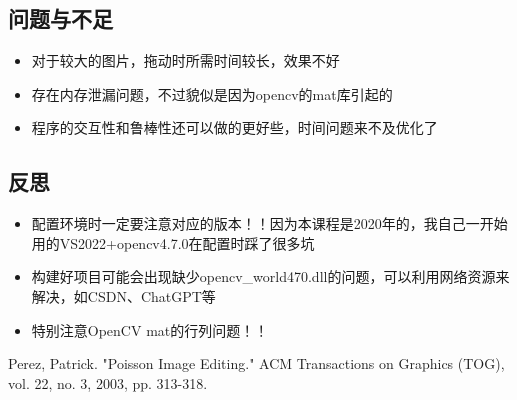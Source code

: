 \documentclass{article}
\begin{document}
    
     \subsection{问题与不足}
     
     \begin{itemize}
     	\item 对于较大的图片，拖动时所需时间较长，效果不好
     \end{itemize}
 
    \begin{itemize}
 	\item 存在内存泄漏问题，不过貌似是因为opencv的mat库引起的
    \end{itemize}

    \begin{itemize}
	\item 程序的交互性和鲁棒性还可以做的更好些，时间问题来不及优化了
    \end{itemize}


  \subsection{反思}
  
   \begin{itemize}
  	\item 配置环境时一定要注意对应的版本！！因为本课程是2020年的，我自己一开始用的VS2022+opencv4.7.0在配置时踩了很多坑
  \end{itemize}

 \begin{itemize}
	\item 构建好项目可能会出现缺少opencv\_world470.dll的问题，可以利用网络资源来解决，如CSDN、ChatGPT等
\end{itemize}

 \begin{itemize}
	\item 特别注意OpenCV mat的行列问题！！
\end{itemize}

	
	
	
	
	
	





\begin{thebibliography}{99}
		Perez, Patrick. "Poisson Image Editing." ACM Transactions on Graphics (TOG), vol. 22, no. 3, 2003, pp. 313-318.
\end{thebibliography}
	
\end{document}
